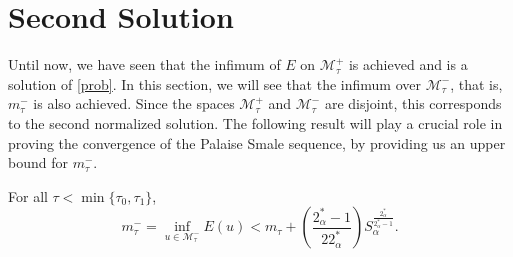 \documentclass[11pt]{article}
\numberwithin{equation}{section}
\numberwithin{mytheorem}{section}
\begin{document}
		\section{Second Solution}
		Until now, we have seen that the infimum of $E$ on $\mathcal{M}_{\tau}^+$ is achieved and is a solution of \eqref{prob}. In this section, we will see that the infimum over $\mathcal{M}_{\tau}^-$, that is, $m_{\tau}^-$ is also achieved. Since the spaces $\mathcal{M}_{\tau}^+$ and $\mathcal{M}_{\tau}^-$ are disjoint, this corresponds to the second normalized solution. The following result will play a crucial role in proving the convergence of the Palaise Smale sequence, by providing us an upper bound for $m_{\tau}^-$. %
		\begin{lemma}\label{Lemma 4.1}
			For all $\tau<\min\{\tau_0,\tau_1\}$,
			\begin{equation}\label{4.1}
				m_{\tau}^-=\inf_{u\in \mathcal{M}_{\tau}^-}E(u)<m_{\tau}+\left(\frac{2^*_{\alpha}-1}{22^*_{\alpha}}\right)S_{\alpha}^{\frac{2^*_{\alpha}}{2^*_{\alpha}-1}}.
			\end{equation}
		\end{lemma}
\end{document}
